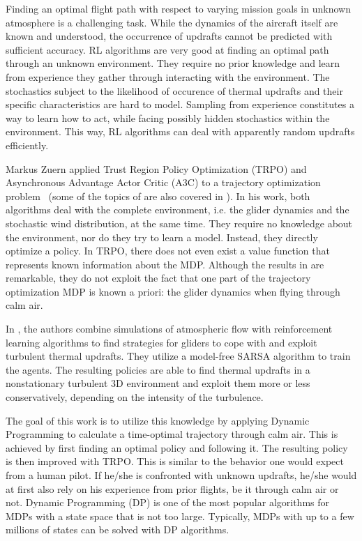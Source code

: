 Finding an optimal flight path with respect to varying mission goals in unknown atmosphere is a challenging task. While the dynamics of the aircraft itself are known and understood, the occurrence of updrafts cannot be predicted with sufficient accuracy. RL algorithms are very good at finding an optimal path through an unknown environment. They require no prior knowledge and learn from experience they gather through interacting with the environment. The stochastics subject to the likelihood of occurence of thermal updrafts and their specific characteristics are hard to model. Sampling from experience constitutes a way to learn how to act, while facing possibly hidden stochastics within the environment. This way, RL algorithms can deal with apparently random updrafts efficiently.

Markus Zuern applied Trust Region Policy Optimization (TRPO) and Asynchronous Advantage Actor Critic (A3C) to a trajectory optimization problem~\cite{Zuern2017} (some of the topics of \cite{Zuern2017} are also covered in \cite{Notter2018}). In his work, both algorithms deal with the complete environment, i.e. the glider dynamics and the stochastic wind distribution, at the same time. They require no knowledge about the environment, nor do they try to learn a model. Instead, they directly optimize a policy. In TRPO, there does not even exist a value function that represents known information about the MDP. Although the results in \cite{Zuern2017} are remarkable, they do not exploit the fact that one part of the trajectory optimization MDP is known a priori: the glider dynamics when flying through calm air.

In \cite{ReddyE4877}, the authors combine simulations of atmospheric flow with reinforcement learning algorithms to find strategies for gliders to cope with and exploit turbulent thermal updrafts. They utilize a model-free SARSA algorithm to train the agents. The resulting policies are able to find thermal updrafts in a nonstationary turbulent 3D environment and exploit them more or less conservatively, depending on the intensity of the turbulence.

The goal of this work is to utilize this knowledge by applying Dynamic Programming to calculate a time-optimal trajectory through calm air. This is achieved by first finding an optimal policy and following it. The resulting policy is then improved with TRPO. This is similar to the behavior one would expect from a human pilot. If he/she is confronted with unknown updrafts, he/she would at first also rely on his experience from prior flights, be it through calm air or not. Dynamic Programming (DP) is one of the most popular algorithms for MDPs with a state space that is not too large. Typically, MDPs with up to a few millions of states can be solved with DP algorithms.

